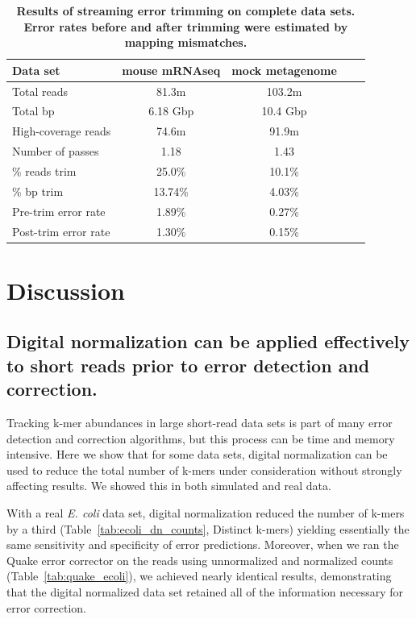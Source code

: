 \documentclass{article}
\begin{document}

\begin{table}
\begin{tabular}{|l|c|c|c|c|}
\hline

Data set             & mouse mRNAseq      & mock metagenome \\
\hline
Total reads          & 81.3m         & 103.2m \\
Total bp             & 6.18 Gbp      & 10.4 Gbp \\
High-coverage reads  & 74.6m         & 91.9m \\
Number of passes     & 1.18          & 1.43 \\
\% reads trim        & 25.0\%        & 10.1\% \\
\% bp trim           & 13.74\%       & 4.03\% \\
Pre-trim error rate  & 1.89\%        & 0.27\% \\
Post-trim error rate & 1.30\%        & 0.15\% \\
\hline
\end{tabular}

\caption{{\bf Results of streaming error trimming on complete data sets.
Error rates before and after trimming were estimated by mapping mismatches.}}
\label{tab:full_trimming}
\end{table}

\section{Discussion}

\subsection{Digital normalization can be applied effectively to short reads prior to error detection and correction.}

Tracking k-mer abundances in large short-read data sets is part of
many error detection and correction algorithms, but this process can
be time and memory intensive.  Here we show that for some data sets,
digital normalization can be used to reduce the total number of k-mers
under consideration without strongly affecting results.
We showed this in both simulated and real data.

With a real {\em E. coli} data set, digital normalization reduced the
number of k-mers by a third (Table~\ref{tab:ecoli_dn_counts}, Distinct
k-mers) yielding essentially the same sensitivity and specificity of
error predictions.  Moreover, when we ran the Quake error corrector on
the reads using unnormalized and normalized counts
(Table~\ref{tab:quake_ecoli}), we achieved nearly identical results,
demonstrating that the digital normalized data set retained all of the
information necessary for error correction.
\end{document}
